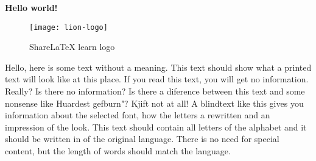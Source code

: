 \documentclass[../main.tex]{subfiles}
\begin{document}
\textbf{Hello world!}

\begin{figure}[bh]
\centering
\texttt{[image: lion-logo]}

\label{fig:img1}
\caption{ShareLaTeX learn logo}
\end{figure}

Hello, here is some text without a meaning.  This text should show what a printed text will look like at this place.  If you read this text, you will get no information.  Really?  Is there no information?  Is there a diference between this text and some nonsense like Huardest gefburn"?  Kjift  not at all!  A blindtext like this gives you information about the selected font, how the letters a rewritten and an impression of the look.  This text should contain all letters of the alphabet and it should be written in of the original language.  There is no need for special content, but the length of words should match the language.
\end{document}
